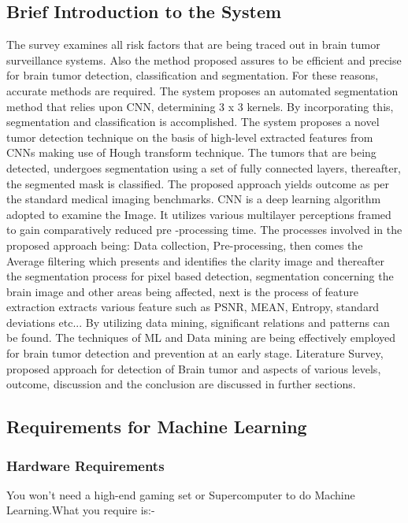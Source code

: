 \documentclass[a4paper, 12pt]{report}
\begin{document}
\begin{spacing}{1.5}
\section{Brief Introduction to the System}
\par The survey examines all risk factors that are being traced out in brain tumor surveillance systems. Also the method proposed assures to be efficient and precise
for brain tumor detection, classification and segmentation. For these reasons, accurate methods are required. The system proposes an automated segmentation method that relies upon CNN, determining 3 x 3 kernels. By incorporating this, segmentation and classification is accomplished. The system proposes a novel tumor detection technique on the basis of high-level extracted features from CNNs making use of Hough transform technique. The tumors that are being detected, undergoes segmentation using a set of fully connected layers, thereafter, the segmented mask is classified. The proposed approach yields outcome as per the standard medical imaging benchmarks. CNN is a deep learning algorithm adopted to examine the Image. It utilizes various multilayer perceptions framed to gain comparatively reduced pre -processing time. The processes involved in the proposed approach being: Data collection, Pre-processing, then comes the Average filtering which presents and identifies the clarity image and thereafter the segmentation process for pixel based detection, segmentation concerning the brain image and other areas being affected, next is the process of feature extraction extracts various feature such as PSNR, MEAN, Entropy, standard deviations etc... By utilizing data mining, significant relations and patterns can be found. The techniques of ML and Data mining are being effectively employed for brain tumor detection and prevention at an early stage. Literature Survey, proposed approach for detection of Brain tumor and aspects of various levels, outcome, discussion and the conclusion are discussed in further sections.\\

\subsection{Requirements for Machine Learning}
\subsubsection{Hardware Requirements}

You won’t need a high-end gaming set or Supercomputer to do Machine Learning.What you require is:-


\end{spacing}
\end{document}

